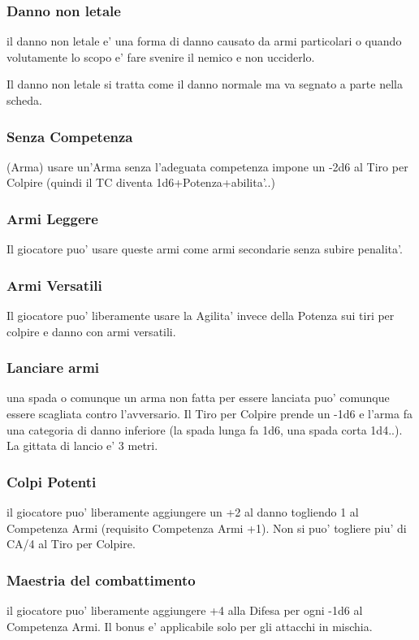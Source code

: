 \documentclass[a4paper,11pt,twoside,openany]{dndbook}
\begin{document}
\subsubsection{Danno non letale} il danno non letale e' una forma di danno causato da armi particolari o quando volutamente lo scopo e' fare svenire il nemico e non ucciderlo.

Il danno non letale si tratta come il danno normale ma va segnato a parte nella scheda.

\subsubsection{Senza Competenza} (Arma) usare un'Arma senza l'adeguata competenza impone un -2d6 al Tiro per Colpire (quindi il TC diventa 1d6+Potenza+abilita'..) 

\subsubsection{Armi Leggere} Il giocatore puo' usare queste armi come armi secondarie senza subire penalita'.

\subsubsection{Armi Versatili} Il giocatore puo' liberamente usare la Agilita' invece della Potenza sui tiri per colpire e danno con armi versatili.

\subsubsection{Lanciare armi} una spada o comunque un arma non fatta per essere lanciata puo' comunque essere scagliata contro l'avversario.
Il Tiro per Colpire prende un -1d6 e l'arma fa una categoria di danno inferiore (la spada lunga fa 1d6, una spada corta 1d4..). La gittata di lancio e' 3 metri.

\subsubsection{Colpi Potenti} il giocatore puo' liberamente aggiungere un +2 al danno togliendo 1 al Competenza Armi (requisito Competenza Armi +1). Non si puo' togliere piu' di CA/4 al Tiro per Colpire.

\subsubsection{Maestria del combattimento} il giocatore puo' liberamente aggiungere +4 alla Difesa per ogni -1d6 al Competenza Armi. Il bonus e' applicabile solo per gli attacchi in mischia.
\end{document}
